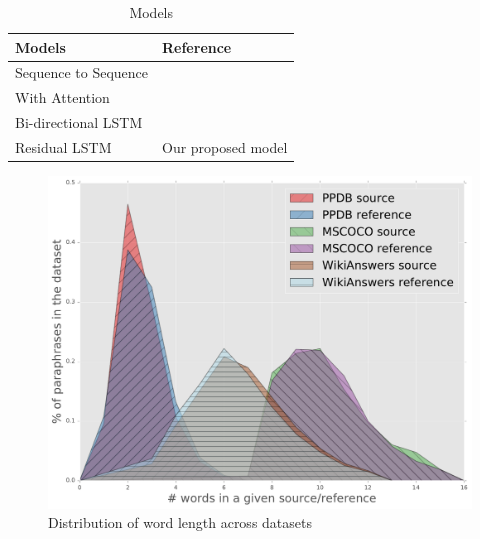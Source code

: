\begin{table}
      \centering
        \begin{tabular}{ll}
        \midrule
        \textbf{Models}                                      & \textbf{Reference}  \\
        \midrule
        Sequence to Sequence                                 & \cite{SutskeverVL14} \\
        With Attention                                       & \cite{Bahdanau15} \\
        Bi-directional LSTM                                  & \cite{graves2013hybrid} \\
        Residual LSTM                                        & Our proposed model                                   \\             
        \midrule
        \end{tabular}
        \caption{Models}
\end{table}


\begin{figure}
    \centering
    \includegraphics[scale=0.30]{figures/paraphrase/wordlength.pdf}
    \caption[Distribution of word length]{Distribution of word length across datasets}
    \label{fig:res1}
\end{figure}

 
